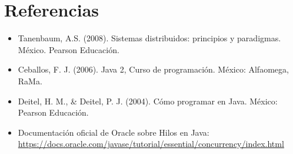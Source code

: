 \documentclass{article}
\begin{document}
\clearpage

\section{Referencias}
\begin{itemize}			
	\item Tanenbaum, A.S. (2008). Sistemas distribuidos: principios y paradigmas. México. Pearson Educación.
    \item Ceballos, F. J. (2006). Java 2, Curso de programación. México: Alfaomega, RaMa.
    \item Deitel, H. M., \& Deitel, P. J. (2004). Cómo programar en Java. México: Pearson Educación.
    \item Documentación oficial de Oracle sobre Hilos en Java: \url{https://docs.oracle.com/javase/tutorial/essential/concurrency/index.html}
\end{itemize}	
			
\end{document}
